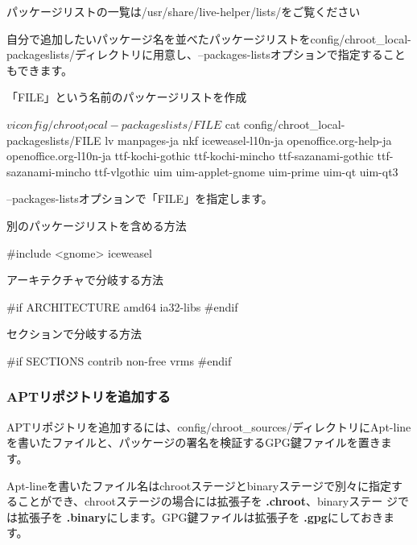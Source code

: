 \documentclass[mingoth,a4paper]{jsarticle}
\begin{document}
パッケージリストの一覧は/usr/share/live-helper/lists/をご覧ください


自分で追加したいパッケージ名を並べたパッケージリストをconfig/chroot\_local-packageslists/ディレクトリに用意し、--packages-listsオプションで指定することもできます。

「FILE」という名前のパッケージリストを作成
\begin{commandline}
$ vi config/chroot_local-packageslists/FILE

$ cat  config/chroot_local-packageslists/FILE
lv manpages-ja nkf
iceweasel-l10n-ja
openoffice.org-help-ja openoffice.org-l10n-ja
ttf-kochi-gothic ttf-kochi-mincho ttf-sazanami-gothic ttf-sazanami-mincho ttf-vlgothic
uim uim-applet-gnome uim-prime uim-qt uim-qt3
\end{commandline}

--packages-listsオプションで「FILE」を指定します。


別のパッケージリストを含める方法
\begin{commandline}
#include <gnome>
iceweasel
\end{commandline}

アーキテクチャで分岐する方法
\begin{commandline}
#if ARCHITECTURE amd64
ia32-libs
#endif
\end{commandline}

セクションで分岐する方法
\begin{commandline}
#if SECTIONS contrib non-free
vrms
#endif
\end{commandline}

\subsubsection{APTリポジトリを追加する}
APTリポジトリを追加するには、config/chroot\_sources/ディレクトリにApt-lineを書いたファイルと、パッケージの署名を検証するGPG鍵ファイルを置きます。

Apt-lineを書いたファイル名はchrootステージとbinaryステージで別々に指定す
ることができ、chrootステージの場合には拡張子を {\bf .chroot}、binaryステー
ジでは拡張子を {\bf .binary}にします。GPG鍵ファイルは拡張子を {\bf .gpg}にしておきます。
\end{document}
